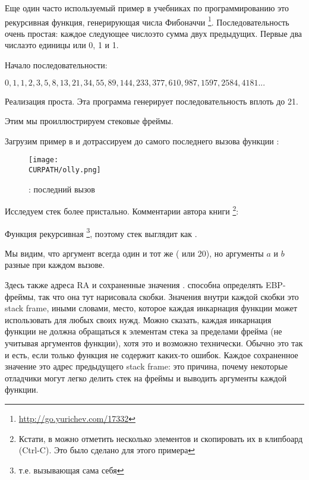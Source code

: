 
Еще один часто используемый пример в учебниках по программированию это рекурсивная функция,
генерирующая числа Фибоначчи
\footnote{\url{http://go.yurichev.com/17332}}.
Последовательность очень простая: каждое следующее число\EMDASH{}это сумма двух предыдущих.
Первые два числа\EMDASH{}это единицы или 0, 1 и 1.

Начало последовательности:

\begin{center}
$0, 1, 1, 2, 3, 5, 8, 13, 21, 34, 55, 89, 144, 233, 377, 610, 987, 1597, 2584, 4181 ...$
\end{center}


Реализация проста. Эта программа генерирует последовательность вплоть до 21.





Этим мы проиллюстрируем стековые фреймы.

\clearpage
Загрузим пример в \olly и дотрассируем до самого последнего вызова функции \ttf{}:

\begin{figure}[H]
\centering
\texttt{[image: \\CURPATH/olly.png]}
\caption{\olly: последний вызов \ttf{}}
\label{fig:fib_olly}
\end{figure}

\clearpage
Исследуем стек более пристально. 
Комментарии автора книги
\footnote{Кстати, в \olly можно отметить несколько элементов и скопировать их в клипбоард (Ctrl-C).
Это было сделано для этого примера}:



Функция рекурсивная
\footnote{т.е. вызывающая сама себя}, 
поэтому стек выглядит как .

Мы видим, что аргумент  всегда один и тот же ( или 20), но аргументы $a$ и $b$ разные при каждом вызове.

Здесь также адреса \ac{RA} и сохраненные значения \EBP.
\olly способна определять EBP-фреймы, так что она тут нарисовала скобки.
Значения внутри каждой скобки это \gls{stack frame}, иными словами, место, которое каждая
инкарнация функции может использовать для любых своих нужд. 
Можно сказать, каждая инкарнация функции не должна обращаться к элементам стека за пределами
фрейма (не учитывая аргументов функции), хотя это и возможно технически. 
Обычно это так и есть, если только функция не содержит каких-то ошибок.
Каждое сохраненное значение \EBP это адрес предыдущего \gls{stack frame}:
это причина, почему некоторые отладчики могут легко делить стек на фреймы и выводить
аргументы каждой функции.

